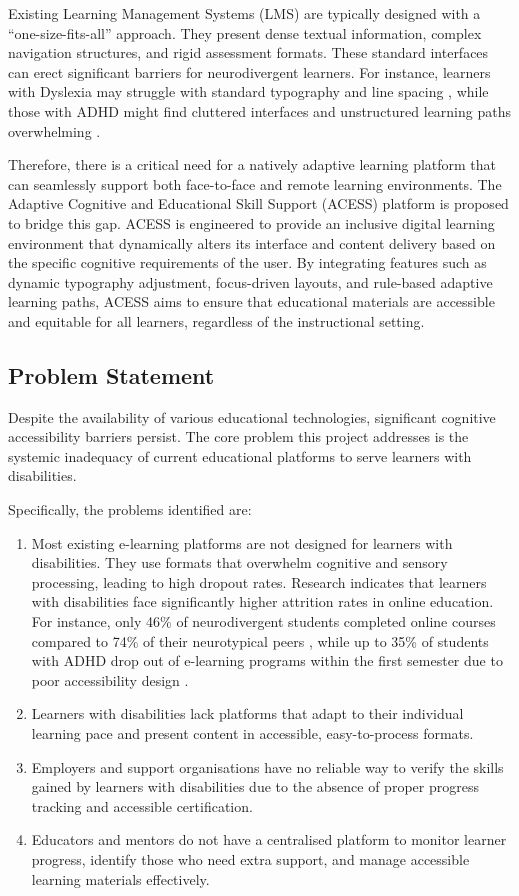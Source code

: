 \documentclass[12pt, oneside]{article} %
\begin{document}
Existing Learning Management Systems (LMS) are typically designed with a ``one-size-fits-all'' approach. They present dense textual information, complex navigation structures, and rigid assessment formats. These standard interfaces can erect significant barriers for neurodivergent learners. For instance, learners with Dyslexia may struggle with standard typography and line spacing \cite{franceschini_dyslexia}, while those with ADHD might find cluttered interfaces and unstructured learning paths overwhelming \cite{barkley1997adhd}. 

Therefore, there is a critical need for a natively adaptive learning platform that can seamlessly support both face-to-face and remote learning environments. The Adaptive Cognitive and Educational Skill Support (ACESS) platform is proposed to bridge this gap. ACESS is engineered to provide an inclusive digital learning environment that dynamically alters its interface and content delivery based on the specific cognitive requirements of the user. By integrating features such as dynamic typography adjustment, focus-driven layouts, and rule-based adaptive learning paths, ACESS aims to ensure that educational materials are accessible and equitable for all learners, regardless of the instructional setting.

\subsection{Problem Statement}

Despite the availability of various educational technologies, significant cognitive accessibility barriers persist. The core problem this project addresses is the systemic inadequacy of current educational platforms to serve learners with disabilities.

Specifically, the problems identified are:
\begin{enumerate}
    \item Most existing e-learning platforms are not designed for learners with disabilities. They use formats that overwhelm cognitive and sensory processing, leading to high dropout rates. Research indicates that learners with disabilities face significantly higher attrition rates in online education. For instance, only 46\% of neurodivergent students completed online courses compared to 74\% of their neurotypical peers \cite{spencer2022neurodiversity}, while up to 35\% of students with ADHD drop out of e-learning programs within the first semester due to poor accessibility design \cite{burl2024neurodiversent}.
    \item Learners with disabilities lack platforms that adapt to their individual learning pace and present content in accessible, easy-to-process formats.
    \item Employers and support organisations have no reliable way to verify the skills gained by learners with disabilities due to the absence of proper progress tracking and accessible certification.
    \item Educators and mentors do not have a centralised platform to monitor learner progress, identify those who need extra support, and manage accessible learning materials effectively.
\end{enumerate}
\end{document}
